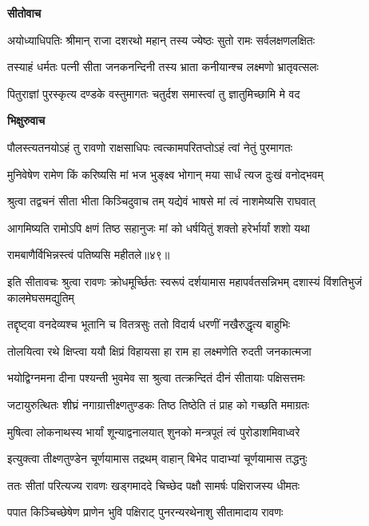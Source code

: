 \textbf{सीतोवाच}

\twolineshloka
{अयोध्याधिपतिः श्रीमान् राजा दशरथो महान्}
{तस्य ज्येष्ठः सुतो रामः सर्वलक्षणलक्षितः} %

\twolineshloka
{तस्याहं धर्मतः पत्नी सीता जनकनन्दिनी}
{तस्य भ्राता कनीयान्श्च लक्ष्मणो भ्रातृवत्सलः} %

\twolineshloka
{पितुराज्ञां पुरस्कृत्य दण्डके वस्तुमागतः}
{चतुर्दश समास्त्वां तु ज्ञातुमिच्छामि मे वद} %

\textbf{भिक्षुरुवाच}

\twolineshloka
{पौलस्त्यतनयोऽहं तु रावणो राक्षसाधिपः}
{त्वत्कामपरितप्तोऽहं त्वां नेतुं पुरमागतः} %

\twolineshloka
{मुनिवेषेण रामेण किं करिष्यसि मां भज}
{भुङ्क्ष्व भोगान् मया सार्धं त्यज दुःखं वनोद्भवम्} %

\twolineshloka
{श्रुत्वा तद्वचनं सीता भीता किञ्चिदुवाच तम्}
{यद्येवं भाषसे मां त्वं नाशमेष्यसि राघवात्} %

\twolineshloka
{आगमिष्यति रामोऽपि क्षणं तिष्ठ सहानुजः}
{मां को धर्षयितुं शक्तो हरेर्भार्यां शशो यथा} %

{रामबाणैर्विभिन्नस्त्वं पतिष्यसि महीतले॥४९॥} %


\threelineshloka
{इति सीतावचः श्रुत्वा रावणः क्रोधमूर्च्छितः}
{स्वरूपं दर्शयामास महापर्वतसन्निभम्}
{दशास्यं विंशतिभुजं कालमेघसमद्युतिम्} %

\twolineshloka
{तद्दृष्ट्वा वनदेव्यश्च भूतानि च वितत्रसुः}
{ततो विदार्य धरणीं नखैरुद्धृत्य बाहुभिः} %

\twolineshloka
{तोलयित्वा रथे क्षिप्त्वा ययौ क्षिप्रं विहायसा}
{हा राम हा लक्ष्मणेति रुदती जनकात्मजा} %

\twolineshloka
{भयोद्विग्नमना दीना पश्यन्ती भुवमेव सा}
{श्रुत्वा तत्क्रन्दितं दीनं सीतायाः पक्षिसत्तमः} %

\twolineshloka
{जटायुरुत्थितः शीघ्रं नगाग्रात्तीक्ष्णतुण्डकः}
{तिष्ठ तिष्ठेति तं प्राह को गच्छति ममाग्रतः} %

\twolineshloka
{मुषित्वा लोकनाथस्य भार्यां शून्याद्वनालयात्}
{शुनको मन्त्रपूतं त्वं पुरोडाशमिवाध्वरे} %

\twolineshloka
{इत्युक्त्वा तीक्ष्णतुण्डेन चूर्णयामास तद्रथम्}
{वाहान् बिभेद पादाभ्यां चूर्णयामास तद्धनुः} %

\twolineshloka
{ततः सीतां परित्यज्य रावणः खड्गमाददे}
{चिच्छेद पक्षौ सामर्षः पक्षिराजस्य धीमतः} %

\twolineshloka
{पपात किञ्चिच्छेषेण प्राणेन भुवि पक्षिराट्}
{पुनरन्यरथेनाशु सीतामादाय रावणः} %

